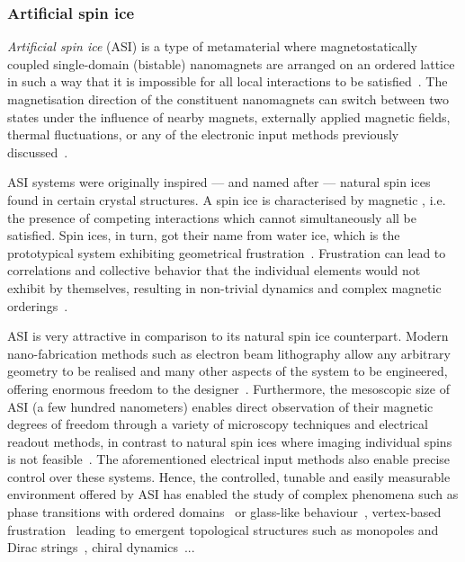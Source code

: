 \subsubsection{Artificial spin ice}\label{sec:1:ASI}
\textit{Artificial spin ice} (ASI) is a type of metamaterial where magnetostatically coupled single-domain (bistable) nanomagnets are arranged on an ordered lattice in such a way that it is impossible for all local interactions to be satisfied~\cite{RC_ASI,flatspin}.
The magnetisation direction of the constituent nanomagnets can switch between two states under the influence of nearby magnets, externally applied magnetic fields, thermal fluctuations, or any of the electronic input methods previously discussed~\cite{CoerciveFieldReversal,BrownThermalFluctuations,SOT_FM_AFM,brataas2012current}. \par
ASI systems were originally inspired --- and named after --- natural spin ices found in certain crystal structures.
A spin ice is characterised by magnetic , i.e. the presence of competing interactions which cannot simultaneously all be satisfied.
Spin ices, in turn, got their name from water ice, which is the prototypical system exhibiting geometrical frustration~\cite{nisoli2013colloquium,ZeroPointEntropy,heyderman2013artificial,MagnetizationDynamicsASI}.
Frustration can lead to correlations and collective behavior that the individual elements would not exhibit by themselves, resulting in non-trivial dynamics and complex magnetic orderings~\cite{AdvancesASI,ASI_computation,ApparentFMpinwheel}. \par
ASI is very attractive in comparison to its natural spin ice counterpart.
Modern nano-fabrication methods such as electron beam lithography allow any arbitrary geometry to be realised and many other aspects of the system to be engineered, offering enormous freedom to the designer~\cite{AdvancesASI,ASI_computation}.
Furthermore, the mesoscopic size of ASI (a few hundred nanometers) enables direct observation of their magnetic degrees of freedom through a variety of microscopy techniques and electrical readout methods, in contrast to natural spin ices where imaging individual spins is not feasible~\cite{nisoli2013colloquium,freeman2001advances}.
The aforementioned electrical input methods also enable precise control over these systems.
Hence, the controlled, tunable and easily measurable environment offered by ASI has enabled the study of complex phenomena such as phase transitions with ordered domains~\cite{ApparentFMpinwheel,sklenar2019field,MeltingASI,ImagingBridgedKagome,sendetskyi2019continuous,lou2023competing,branford2012emerging} or glass-like behaviour~\cite{wang2006artificial,ZeroPointEntropy}, vertex-based frustration~\cite{morrison2013unhappy,nisoli2018topologytetris} leading to emergent topological structures such as monopoles and Dirac strings~\cite{ObservationMonopoleASI,mengotti2011kagome}, chiral dynamics~\cite{branford2012emerging,EmergentChiralityRatchet}...
